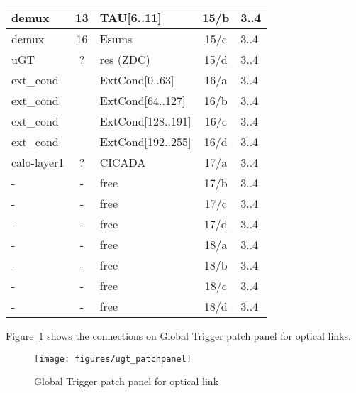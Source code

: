 \begin{longtable}{|l|c|l|c|l|}
demux & 13  & TAU[6..11] & 15/b & 3..4 \\\hline
demux & 16  & Esums      & 15/c & 3..4 \\\hline
uGT   & ?   & res (ZDC)  & 15/d & 3..4 \\\hline
ext\_cond &     & ExtCond[0..63]    & 16/a & 3..4 \\\hline
ext\_cond &     & ExtCond[64..127]  & 16/b & 3..4 \\\hline
ext\_cond &     & ExtCond[128..191] & 16/c & 3..4 \\\hline
ext\_cond &     & ExtCond[192..255] & 16/d & 3..4 \\\hline
calo-layer1 & ? & CICADA & 17/a & 3..4 \\\hline
- & - & free & 17/b & 3..4 \\\hline
- & - & free & 17/c & 3..4 \\\hline
- & - & free & 17/d & 3..4 \\\hline
- & - & free & 18/a & 3..4 \\\hline
- & - & free & 18/b & 3..4 \\\hline
- & - & free & 18/c & 3..4 \\\hline
- & - & free & 18/d & 3..4 \\\hline
\end{longtable}

Figure~\ref{fig:app:ugt_pp} shows the connections on Global Trigger patch panel for optical links.

\begin{figure}[htb]
\centering
\texttt{[image: figures/ugt\_patchpanel]}
\caption{Global Trigger patch panel for optical link}
\label{fig:app:ugt_pp}
\end{figure}

\clearpage
